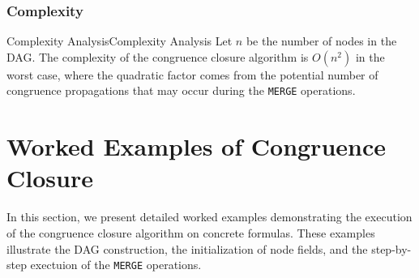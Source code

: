 \documentclass[a4paper]{article}
\theoremstyle{definition}
\begin{document}
\subsubsection{Complexity}
\begin{definition}{Complexity Analysis}{Complexity Analysis}
Let \( n \) be the number of nodes in the DAG. The complexity of the congruence closure algorithm is \( O(n^2) \) in the worst case, 
where the quadratic factor comes from the potential number of congruence propagations that may occur during the \texttt{MERGE} 
operations.
\end{definition}
\section{Worked Examples of Congruence Closure}
In this section, we present detailed worked examples demonstrating the execution of the congruence closure algorithm 
on concrete formulas. These examples illustrate the DAG construction, the initialization of node fields, and the step-by-step exectuion of 
the \texttt{MERGE} operations.
\end{document}

